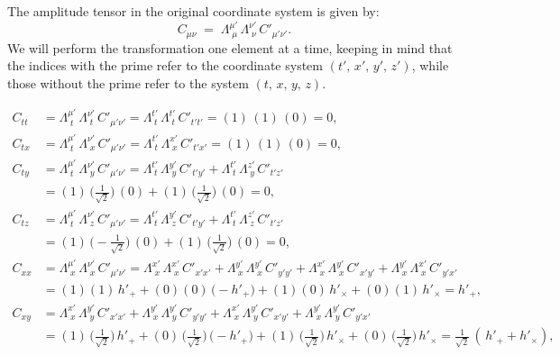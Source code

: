 \documentclass{article}
\begin{document}
The amplitude tensor in the original coordinate system is given by:
\[
C_{\mu\nu} \;=\;
\Lambda^{\mu'}_{\;\mu}\,\Lambda^{\nu'}_{\;\nu}\,C'_{\mu'\nu'}.
\]
We will perform the transformation one element at a time, keeping in mind that the indices with the prime refer to the coordinate system $(t',\,x',\,y',\,z')$, while those without the prime refer to the system $(t,\,x,\,y,\,z)$.

\begin{align*}
C_{tt}
&= \Lambda^{\mu'}_{\;t}\,\Lambda^{\nu'}_{\;t}\,C'_{\mu'\nu'}
= \Lambda^{t'}_{\;t}\,\Lambda^{t'}_{\;t}\,C'_{t't'}
= (1)\,(1)\,(0)
= 0, \\[6pt]
C_{tx}
&= \Lambda^{\mu'}_{\;t}\,\Lambda^{\nu'}_{\;x}\,C'_{\mu'\nu'}
= \Lambda^{t'}_{\;t}\,\Lambda^{x'}_{\;x}\,C'_{t'x'}
= (1)\,(1)\,(0)
= 0, \\[6pt]
C_{ty}
&= \Lambda^{\mu'}_{\;t}\,\Lambda^{\nu'}_{\;y}\,C'_{\mu'\nu'}
= \Lambda^{t'}_{\;t}\,\Lambda^{y'}_{\;y}\,C'_{t'y'}
+ \Lambda^{t'}_{\;t}\,\Lambda^{z'}_{\;y}\,C'_{t'z'}\\
&= (1)\,\bigl(\tfrac{1}{\sqrt{2}}\bigr)\,(0)
+ (1)\,\bigl(\tfrac{1}{\sqrt{2}}\bigr)\,(0)
= 0, \\[6pt]
C_{tz}
&= \Lambda^{\mu'}_{\;t}\,\Lambda^{\nu'}_{\;z}\,C'_{\mu'\nu'}
= \Lambda^{t'}_{\;t}\,\Lambda^{y'}_{\;z}\,C'_{t'y'}
+ \Lambda^{t'}_{\;t}\,\Lambda^{z'}_{\;z}\,C'_{t'z'}\\
&= (1)\,\bigl(-\tfrac{1}{\sqrt{2}}\bigr)\,(0)
+ (1)\,\bigl(\tfrac{1}{\sqrt{2}}\bigr)\,(0)
= 0, \\[6pt]
C_{xx}
&= \Lambda^{\mu'}_{\;x}\,\Lambda^{\nu'}_{\;x}\,C'_{\mu'\nu'}
= \Lambda^{x'}_{\;x}\,\Lambda^{x'}_{\;x}\,C'_{x'x'}
+ \Lambda^{y'}_{\;x}\,\Lambda^{y'}_{\;x}\,C'_{y'y'}
+ \Lambda^{x'}_{\;x}\,\Lambda^{y'}_{\;x}\,C'_{x'y'}
+ \Lambda^{y'}_{\;x}\,\Lambda^{x'}_{\;x}\,C'_{y'x'} \\
&= (1)(1)\,h'_{+} + (0)(0)\,\bigl(-h'_{+}\bigr)
+ (1)(0)\,h'_{\times} + (0)(1)\,h'_{\times}
= h'_{+}, \\[6pt]
C_{xy}
&= \Lambda^{x'}_{\;x}\,\Lambda^{y'}_{\;y}\,C'_{x'x'}
+ \Lambda^{y'}_{\;x}\,\Lambda^{y'}_{\;y}\,C'_{y'y'}
+ \Lambda^{x'}_{\;x}\,\Lambda^{y'}_{\;y}\,C'_{x'y'}
+ \Lambda^{y'}_{\;x}\,\Lambda^{y'}_{\;y}\,C'_{y'x'} \\
&= (1)\,\bigl(\tfrac{1}{\sqrt{2}}\bigr)\,h'_{+}
+ (0)\,\bigl(\tfrac{1}{\sqrt{2}}\bigr)\,\bigl(-h'_{+}\bigr)
+ (1)\,\bigl(\tfrac{1}{\sqrt{2}}\bigr)\,h'_{\times}
+ (0)\,\bigl(\tfrac{1}{\sqrt{2}}\bigr)\,h'_{\times}
= \tfrac{1}{\sqrt{2}}\,(\,h'_{+} + h'_{\times}), \\[6pt]

\end{align*}
\end{document}
